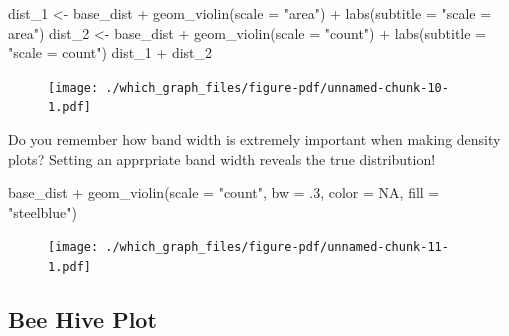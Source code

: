 \documentclass[
  letterpaper,
]{book}
\newenvironment{Shaded}{\begin{snugshade}}{\end{snugshade}}
\newcommand{\AttributeTok}[1]{\textcolor[rgb]{0.40,0.45,0.13}{#1}}
\newcommand{\ConstantTok}[1]{\textcolor[rgb]{0.56,0.35,0.01}{#1}}
\newcommand{\DecValTok}[1]{\textcolor[rgb]{0.68,0.00,0.00}{#1}}
\newcommand{\FunctionTok}[1]{\textcolor[rgb]{0.28,0.35,0.67}{#1}}
\newcommand{\NormalTok}[1]{\textcolor[rgb]{0.00,0.23,0.31}{#1}}
\newcommand{\OtherTok}[1]{\textcolor[rgb]{0.00,0.23,0.31}{#1}}
\newcommand{\SpecialCharTok}[1]{\textcolor[rgb]{0.37,0.37,0.37}{#1}}
\newcommand{\StringTok}[1]{\textcolor[rgb]{0.13,0.47,0.30}{#1}}
\begin{document}
\begin{Shaded}
\begin{Highlighting}[]
\NormalTok{dist\_1 }\OtherTok{\textless{}{-}}\NormalTok{ base\_dist }\SpecialCharTok{+} \FunctionTok{geom\_violin}\NormalTok{(}\AttributeTok{scale =} \StringTok{"area"}\NormalTok{) }\SpecialCharTok{+} \FunctionTok{labs}\NormalTok{(}\AttributeTok{subtitle =} \StringTok{"scale = \textquotesingle{}area\textquotesingle{}"}\NormalTok{)}
\NormalTok{dist\_2 }\OtherTok{\textless{}{-}}\NormalTok{ base\_dist }\SpecialCharTok{+} \FunctionTok{geom\_violin}\NormalTok{(}\AttributeTok{scale =} \StringTok{"count"}\NormalTok{) }\SpecialCharTok{+} \FunctionTok{labs}\NormalTok{(}\AttributeTok{subtitle =} \StringTok{"scale = \textquotesingle{}count\textquotesingle{}"}\NormalTok{)}
\NormalTok{dist\_1 }\SpecialCharTok{+}\NormalTok{ dist\_2}
\end{Highlighting}
\end{Shaded}

\begin{figure}[H]

{\centering \texttt{[image: ./which\_graph\_files/figure-pdf/unnamed-chunk-10-1.pdf]}

}

\end{figure}

Do you remember how band width is extremely important when making
density plots? Setting an apprpriate band width reveals the true
distribution!

\begin{Shaded}
\begin{Highlighting}[]
\NormalTok{base\_dist }\SpecialCharTok{+} \FunctionTok{geom\_violin}\NormalTok{(}\AttributeTok{scale =} \StringTok{"count"}\NormalTok{, }\AttributeTok{bw =}\NormalTok{ .}\DecValTok{3}\NormalTok{, }\AttributeTok{color =} \ConstantTok{NA}\NormalTok{, }\AttributeTok{fill =} \StringTok{"steelblue"}\NormalTok{)}
\end{Highlighting}
\end{Shaded}

\begin{figure}[H]

{\centering \texttt{[image: ./which\_graph\_files/figure-pdf/unnamed-chunk-11-1.pdf]}

}

\end{figure}

\hypertarget{bee-hive-plot}{%
\subsection{Bee Hive Plot}\label{bee-hive-plot}}
\end{document}

